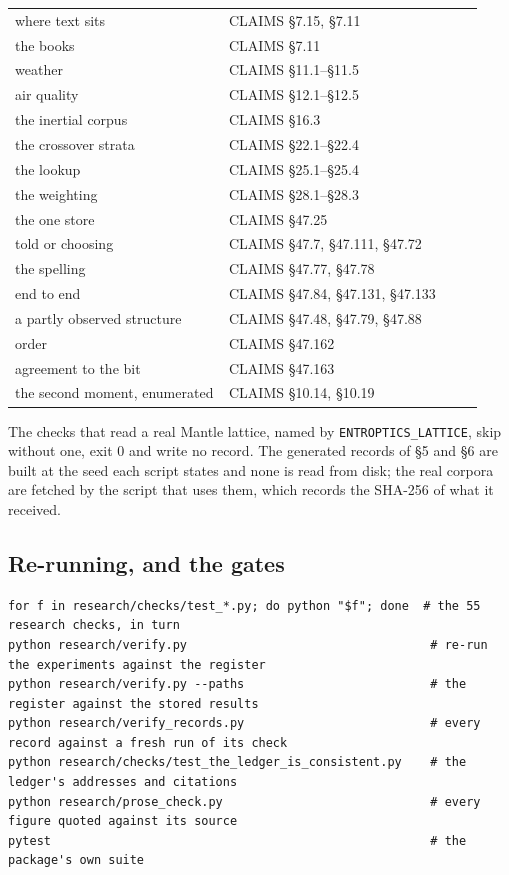 \documentclass[10pt,letterpaper,twocolumn]{article}
\begin{document}
\begin{center}
{\begin{xtabular}{L{0.426\linewidth}L{0.505\linewidth}}
where text sits & CLAIMS §7.15, §7.11 \\
the books & CLAIMS §7.11 \\
weather & CLAIMS §11.1--§11.5 \\
air quality & CLAIMS §12.1--§12.5 \\
the inertial corpus & CLAIMS §16.3 \\
the crossover strata & CLAIMS §22.1--§22.4 \\
the lookup & CLAIMS §25.1--§25.4 \\
the weighting & CLAIMS §28.1--§28.3 \\
the one store & CLAIMS §47.25 \\
told or choosing & CLAIMS §47.7, §47.111, §47.72 \\
the spelling & CLAIMS §47.77, §47.78 \\
end to end & CLAIMS §47.84, §47.131, §47.133 \\
a partly observed structure & CLAIMS §47.48, §47.79, §47.88 \\
order & CLAIMS §47.162 \\
agreement to the bit & CLAIMS §47.163 \\
the second moment, enumerated & CLAIMS §10.14, §10.19 \\
\end{xtabular}
}
\end{center}

The checks that read a real Mantle lattice, named by \texttt{ENTROPTICS\_\allowbreak{}LATTICE}, skip without one, exit 0
and write no record. The generated records of §5 and §6 are built at the seed each script states and
none is read from disk; the real corpora are fetched by the script that uses them, which records the
SHA-256 of what it received.

\subsection{Re-running, and the gates}\label{re-running-and-the-gates}

\begin{verbatim}
for f in research/checks/test_*.py; do python "$f"; done  # the 55 research checks, in turn
python research/verify.py                                  # re-run the experiments against the register
python research/verify.py --paths                          # the register against the stored results
python research/verify_records.py                          # every record against a fresh run of its check
python research/checks/test_the_ledger_is_consistent.py    # the ledger's addresses and citations
python research/prose_check.py                             # every figure quoted against its source
pytest                                                     # the package's own suite
\end{verbatim}
\end{document}
